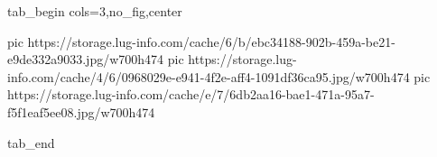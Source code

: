  
 
 
 
 


\ifcmt
  tab_begin cols=3,no_fig,center

     pic https://storage.lug-info.com/cache/6/b/ebc34188-902b-459a-be21-e9de332a9033.jpg/w700h474%
		 pic https://storage.lug-info.com/cache/4/6/0968029e-e941-4f2e-aff4-1091df36ca95.jpg/w700h474%
		 pic https://storage.lug-info.com/cache/e/7/6db2aa16-bae1-471a-95a7-f5f1eaf5ee08.jpg/w700h474%

  tab_end
\fi
